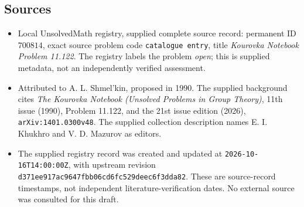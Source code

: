 \documentclass[11pt]{article}
\begin{document}
\subsection{Sources}
\begin{itemize}
\item Local UnsolvedMath registry, supplied complete source record: permanent ID \(700814\), exact source problem code \texttt{catalogue entry}, title \emph{Kourovka Notebook Problem 11.122}. The registry labels the problem \emph{open}; this is supplied metadata, not an independently verified assessment.
\item Attributed to A. L. Shmel'kin, proposed in 1990. The supplied background cites \emph{The Kourovka Notebook (Unsolved Problems in Group Theory)}, 11th issue (1990), Problem 11.122, and the 21st issue edition (2026), \texttt{arXiv:1401.0300v48}. The supplied collection description names E. I. Khukhro and V. D. Mazurov as editors.
\item The supplied registry record was created and updated at \texttt{2026-10-16T14:00:00Z}, with upstream revision \texttt{d371ee917ac9647fbb06cd6fc529deec6f3dda82}. These are source-record timestamps, not independent literature-verification dates. No external source was consulted for this draft.
\end{itemize}
\end{document}
